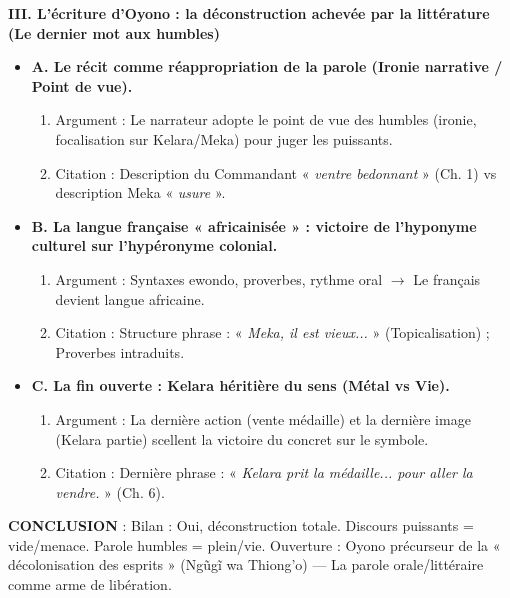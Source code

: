 \documentclass[11pt]{article}
\begin{document}
\begin{exoresolu}
\textbf{III. L'écriture d'Oyono : la déconstruction achevée par la littérature (Le dernier mot aux humbles)}
\begin{itemize}
    \item \textbf{A. Le récit comme réappropriation de la parole (Ironie narrative / Point de vue).}
    \begin{enumerate}
        \item Argument : Le narrateur adopte le point de vue des humbles (ironie, focalisation sur Kelara/Meka) pour juger les puissants.
        \item Citation : Description du Commandant « \emph{ventre bedonnant} » (Ch. 1) vs description Meka « \emph{usure} ».
    \end{enumerate}
    \item \textbf{B. La langue française « africainisée » : victoire de l'hyponyme culturel sur l'hypéronyme colonial.}
    \begin{enumerate}
        \item Argument : Syntaxes ewondo, proverbes, rythme oral $\to$ Le français devient langue africaine.
        \item Citation : Structure phrase : « \emph{Meka, il est vieux...} » (Topicalisation) ; Proverbes intraduits.
    \end{enumerate}
    \item \textbf{C. La fin ouverte : Kelara héritière du sens (Métal vs Vie).}
    \begin{enumerate}
        \item Argument : La dernière action (vente médaille) et la dernière image (Kelara partie) scellent la victoire du concret sur le symbole.
        \item Citation : Dernière phrase : « \emph{Kelara prit la médaille... pour aller la vendre.} » (Ch. 6).
    \end{enumerate}
\end{itemize}

\textbf{CONCLUSION} : Bilan : Oui, déconstruction totale. Discours puissants = vide/menace. Parole humbles = plein/vie. Ouverture : Oyono précurseur de la « décolonisation des esprits » (Ngũgĩ wa Thiong'o) — La parole orale/littéraire comme arme de libération.
\end{exoresolu}
\end{document}
